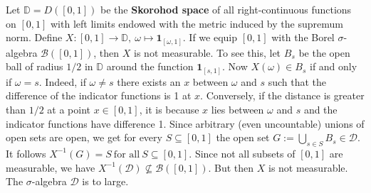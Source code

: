 \begin{example}
  \emph{\cite[Problem~1.7.3]{vaart2013}}
  Let $\mathbb{D}=D([0,1])$ be the \textbf{Skorohod space} of all right-continuous functions on $[0,1]$
  with left limits endowed with the metric induced by the supremum norm.
  Define 
  $
    X:
    [0,1]
    \to
    \mathbb{D}
    ,\ 
    \omega
    \mapsto
    \mathbf{1}_{[\omega,1]}
    .
  $
  If we equip $[0,1]$ with the Borel $\sigma$-algebra 
  $\mathcal{B}([0,1])$, then 
  $X$ is not measurable. To see this, let $B_s$ be the open ball of radius $1/2$ in $\mathbb{D}$ around the function $\mathbf{1}_{[s,1]}.$
  Now $X(\omega)\in B_s$
  if and only if $\omega=s.$ Indeed, if $\omega\neq s$ there exists an $x$ between $\omega$ and $s$ such that the difference of the indicator functions is 1 at $x$. Conversely, if the distance is greater than
  $1/2$ at a point $x\in [0,1]$, it is because $x$ lies between $\omega$ and $s$ and the indicator functions have difference 1.
  Since arbitrary (even uncountable) unions of open sets are open,
  we get for every $S\subseteq [0,1]$ the open set 
  $
  G
  :=
  \bigcup_{s\in S}
    B_s
    \in \mathcal{D}
    .
  $
  It follows
  $
  X^{-1}(G)=S 
  \ 
  \text{for all}
  \ 
  S \subseteq [0,1]
  .
  $
  Since not all subsets of $[0,1]$ are measurable, we have
  $
  X^{-1}(\mathcal{D})\nsubseteq \mathcal{B}([0,1])
.
$
But then $X$ is not measurable. The $\sigma$-algebra $\mathcal{D}$ is to large.
\end{example}
%
